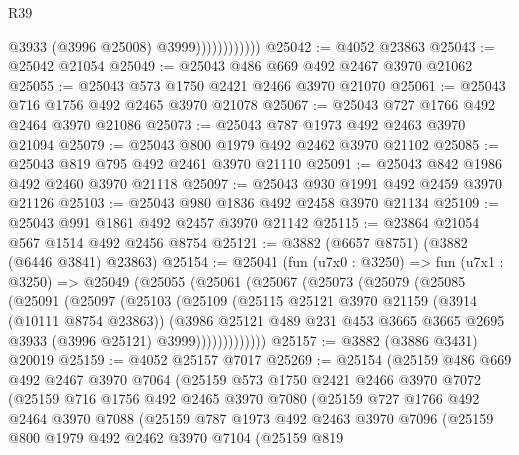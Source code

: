 \begin{lexlean}{R39}
\begin{coremodule}
                            @3933
                            (@3996 @25008)
                            @3999))))))))))))
@25042 := @4052 @23863
@25043 := @25042 @21054
@25049 := @25043 @486 @669 @492 @2467 @3970 @21062
@25055 := @25043 @573 @1750 @2421 @2466 @3970 @21070
@25061 := @25043 @716 @1756 @492 @2465 @3970 @21078
@25067 := @25043 @727 @1766 @492 @2464 @3970 @21086
@25073 := @25043 @787 @1973 @492 @2463 @3970 @21094
@25079 := @25043 @800 @1979 @492 @2462 @3970 @21102
@25085 := @25043 @819 @795 @492 @2461 @3970 @21110
@25091 := @25043 @842 @1986 @492 @2460 @3970 @21118
@25097 := @25043 @930 @1991 @492 @2459 @3970 @21126
@25103 := @25043 @980 @1836 @492 @2458 @3970 @21134
@25109 := @25043 @991 @1861 @492 @2457 @3970 @21142
@25115 := @23864 @21054 @567 @1514 @492 @2456 @8754
@25121 := @3882 (@6657 @8751) (@3882 (@6446 @3841) @23863)
@25154 := @25041
    (fun (u7x0 : @3250) =>
    fun (u7x1 : @3250) =>
    @25049
      (@25055
        (@25061
          (@25067
            (@25073
              (@25079
                (@25085
                  (@25091
                    (@25097
                      (@25103
                        (@25109
                          (@25115
                            @25121
                            @3970
                            @21159
                            (@3914 (@10111 @8754 @23863))
                            (@3986
                              @25121
                              @489
                              @231
                              @453
                              @3665
                              @3665
                              @2695
                              @3933
                              (@3996 @25121)
                              @3999)))))))))))))
@25157 := @3882 (@3886 @3431) @20019
@25159 := @4052 @25157 @7017
@25269 := @25154
    (@25159
      @486
      @669
      @492
      @2467
      @3970
      @7064
      (@25159
        @573
        @1750
        @2421
        @2466
        @3970
        @7072
        (@25159
          @716
          @1756
          @492
          @2465
          @3970
          @7080
          (@25159
            @727
            @1766
            @492
            @2464
            @3970
            @7088
            (@25159
              @787
              @1973
              @492
              @2463
              @3970
              @7096
              (@25159
                @800
                @1979
                @492
                @2462
                @3970
                @7104
                (@25159
                  @819

\end{coremodule}
\end{lexlean}
